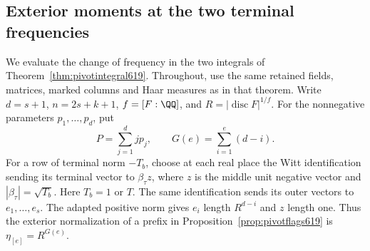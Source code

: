 \documentclass[a4paper,11pt]{article}
\theoremstyle{definition}
\theoremstyle{remark}
\numberwithin{equation}{section}
\begin{document}
\subsection{Exterior moments at the two terminal frequencies}
\label{sec:exteriormoments620}

We evaluate the change of frequency in the two integrals of
Theorem~\ref{thm:pivotintegral619}. Throughout, use the same
retained fields, matrices, marked columns and Haar measures as
in that theorem. Write \(d=s+1\), \(n=2s+k+1\),
\(f=[F:\QQ]\), and \(R=|\operatorname{disc}F|^{1/f}\).
For the nonnegative parameters \(p_1,\ldots,p_d\), put
\[
                P=\sum_{j=1}^d j p_j,\qquad
                G(e)=\sum_{i=1}^{e}(d-i).
\]
For a row of terminal norm \(-T_b\), choose at each real place
the Witt identification sending its terminal vector to
\(\beta_\tau z\), where \(z\) is the middle unit negative vector
and \(|\beta_\tau|=\sqrt{T_b}\). Here \(T_b=1\) or \(T\).
The same identification sends its outer vectors to
\(e_1,\ldots,e_s\). The adapted positive norm gives \(e_i\)
length \(R^{d-i}\) and \(z\) length one. Thus the exterior
normalization of a prefix in Proposition~\ref{prop:pivotflags619}
is \(\eta_{[e]}=R^{G(e)}\).
\end{document}
